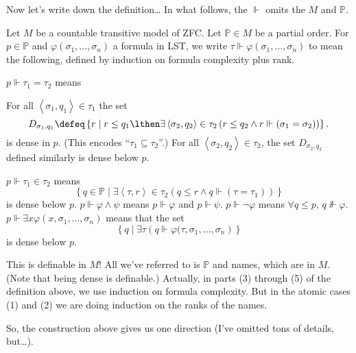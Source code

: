 \documentclass[11pt]{scrreprt}
\newcommand{\Po}{\mathbb P}
\begin{document}
Now let's write down the definition\dots
In what follows, the $\Vdash$ omits the $M$ and $\Po$.
\begin{definition}
	Let $M$ be a countable transitive model of ZFC.
	Let $\Po \in M$ be a partial order.
	For $p \in \Po$ and $\varphi(\sigma_1, \dots, \sigma_n)$ a formula in LST, we write $\tau \Vdash \varphi(\sigma_1, \dots, \sigma_n)$ to mean the following, defined by induction on formula complexity plus rank.
	\begin{enumerate}[(1)]
		\ii $p \Vdash \tau_1 = \tau_2$ means
		\begin{enumerate}[(i)]
			\ii For all $\left<\sigma_1, q_1\right> \in \tau_1$ the set
			\[ D_{\sigma_1, q_1}
				\defeq
				\left\{ r \mid
				r \le q_1 \lthen \exists \left<\sigma_2, q_2\right> \in \tau_2 \left( r \le q_2 \land r \Vdash (\sigma_1 = \sigma_2) \right)\right\}.
			\]
			is dense in $p$.
			(This encodes ``$\tau_1 \subseteq \tau_2$''.)
			\ii For all $\left<\sigma_2, q_2\right> \in \tau_2$,
			the set $D_{\sigma_2, q_2}$ defined similarly is dense below $p$.
		\end{enumerate}
		\ii $p \Vdash \tau_1 \in \tau_2$ means
		\[
		\left\{ q \in \Po
		\mid \exists \left<\tau, r\right> \in \tau_2 
		\left( q \le r \land q \Vdash(\tau=\tau_1) \right)
		\right\} \]
		is dense below $p$.
		\ii $p \Vdash \varphi \land \psi$ means $p \Vdash \varphi$ and $p \Vdash \psi$.
		\ii $p \Vdash \neg \varphi$ means $\forall q \le p$, $q \not\Vdash \varphi$.
		\ii $p \Vdash \exists x \varphi(x, \sigma_1, \dots, \sigma_n)$ means that the set
		\[
			\left\{ q \mid \exists \tau
				\left( q \Vdash \varphi(\tau, \sigma_1, \dots, \sigma_n \right)
			\right\}
		\]
		is dense below $p$.
	\end{enumerate}
\end{definition}
This is definable in $M$!
All we've referred to is $\Po$ and names, which are in $M$.
(Note that being dense is definable.)
Actually, in parts (3) through (5) of the definition above,
we use induction on formula complexity.
But in the atomic cases (1) and (2) we are doing induction on the ranks of the names.

So, the construction above gives us one direction (I've omitted tons of details, but\dots).
\end{document}
